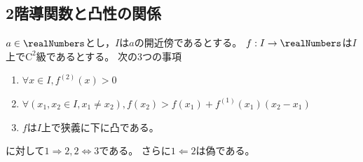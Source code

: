         \subsection{2階導関数と凸性の関係}
            \begin{shadebox}
                $a\in\realNumbers$とし，$I$は$a$の開近傍であるとする。
                $f:I\to\realNumbers$は$I$上で$\mathrm{C}^2$級であるとする。
                次の3つの事項
                \begin{enumerate}
                    \item $\forall x\in I, f^{(2)}(x) > 0$
                    \item $\forall (x_1,x_2\in I,x_1\neq x_2),f(x_2) > f(x_1) + f^{(1)}(x_1)(x_2-x_1)$
                    \item $f$は$I$上で狭義に下に凸である。
                \end{enumerate}
                に対して$1\Rightarrow 2,2\iff 3$である。
                さらに$1\Leftarrow 2$は偽である。
            \end{shadebox}
